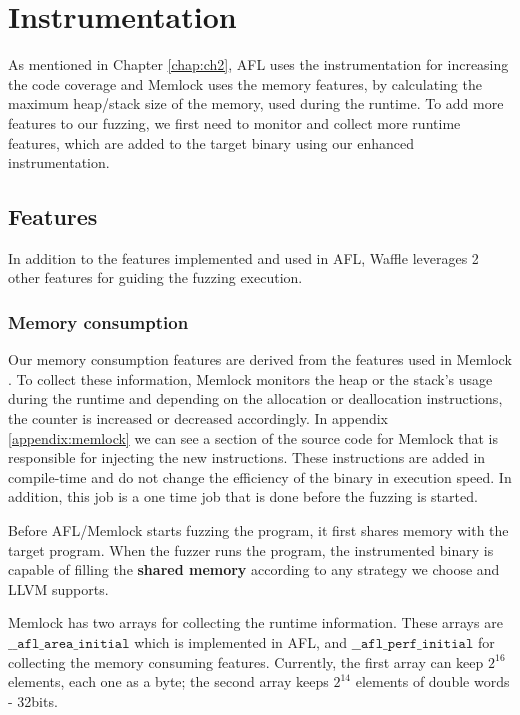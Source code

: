\section{Instrumentation}

As mentioned in Chapter \ref{chap:ch2}, AFL uses the instrumentation for increasing the code coverage and Memlock uses the memory features, by calculating the maximum heap/stack size of the memory, used during the runtime. To add more features to our fuzzing, we first need to monitor and collect more runtime features, which are added to the target binary using our enhanced instrumentation.

\subsection{Features}

In addition to the features implemented and used in AFL, Waffle leverages 2 other features for guiding the fuzzing execution.
\subsubsection{Memory consumption}
Our memory consumption features are derived from the features used in Memlock \cite{wen2020memlock}. To collect these information, Memlock monitors the heap or the stack's usage during the runtime and depending on the allocation or deallocation instructions, the counter is increased or decreased accordingly. In appendix \ref{appendix:memlock} we can see a section of the source code for Memlock that is responsible for injecting the new instructions. These instructions are added in compile-time and do not change the efficiency of the binary in execution speed. In addition, this job is a one time job that is done before the fuzzing is started.

Before AFL/Memlock starts fuzzing the program, it first shares memory with the target program. When the fuzzer runs the program, the instrumented binary is capable of filling the \textbf{shared memory} according to any strategy we choose and LLVM supports.

Memlock has two arrays for collecting the runtime information. These arrays are $\texttt{\_\_afl\_area\_initial}$ which is implemented in AFL, and $\texttt{\_\_afl\_perf\_initial}$ for collecting the memory consuming features. Currently, the first array can keep $2^{16}$ elements, each one as a byte; the second array keeps $2^{14}$ elements of double words - 32bits.

